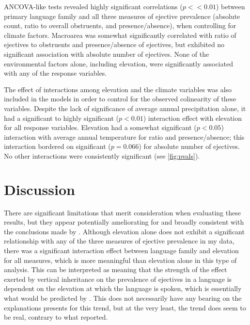 \documentclass{article}
\begin{document}
ANCOVA-like tests revealed highly significant correlations ($p << 0.01$) between primary language family and all three measures of ejective prevalence (absolute count, ratio to overall obstruents, and presence/absence), when controlling for climate factors. Macroarea was somewhat significantly correlated with ratio of ejectives to obstruents and presence/absence of ejectives, but exhibited no significant association with absolute number of ejectives. None of the environmental factors alone, including elevation, were significantly associated with any of the response variables.

The effect of interactions among elevation and the climate variables was also included in the models in order to control for the observed colinearity of these variables. Despite the lack of significance of average annual precipitation alone, it had a significant to highly significant ($p < 0.01$) interaction effect with elevation for all response variables. Elevation had a somewhat significant ($p < 0.05$) interaction with average annual temperature for ratio and presence/absence; this interaction bordered on significant ($p = 0.066$) for absolute number of ejectives. No other interactions were consistently significant (see \ref{fig:pvals}). 

\section{Discussion}
There are significant limitations that merit consideration when evaluating these results, but they appear potentially ameliorating for \textcite{everett2013} and broadly consistent with the conclusions made by \textcite{urban2021}. Although elevation alone does not exhibit a significant relationship with any of the three measures of ejective prevalence in my data, there was a significant interaction effect between language family and elevation for all measures, which is more meaningful than elevation alone in this type of analysis. This can be interpreted as meaning that the strength of the effect exerted by vertical inheritance on the prevalence of ejectives in a language is dependent on the elevation at which the language is spoken, which is essentially what would be predicted by \textcite{everett2013}. This does not necessarily have any bearing on the explanations \cite{everett2013} presents for this trend, but at the very least, the trend does seem to be real, contrary to what \textcite{hammarstroem2013} reported.
\end{document}

